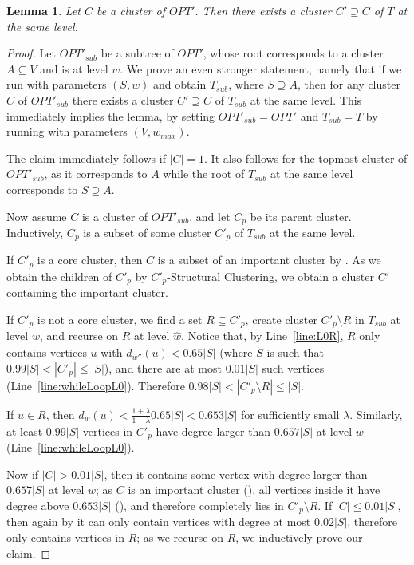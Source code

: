 \documentclass{article}
\newtheorem{lemma}[theorem]{Lemma}
\begin{document}
\begin{lemma} \label{lem:inclusion}
Let $C$ be a cluster of $OPT'$. Then there exists a cluster $C' \supseteq C$ of $T$ at the same level.
\end{lemma}
\begin{proof}
Let $OPT'_{sub}$ be a subtree of $OPT'$, whose root corresponds to a cluster $A\subseteq V$ and is at level $w$.
We prove an even stronger statement, namely that if we run  with parameters $(S,w)$ and obtain $T_{sub}$, where $S\supseteq A$, then for any cluster $C$ of $OPT'_{sub}$ there exists a cluster $C' \supseteq C$ of $T_{sub}$ at the same level.
This immediately implies the lemma, by setting $OPT'_{sub}=OPT'$ and $T_{sub}=T$ by running  with parameters $(V,w_{max})$.

The claim immediately follows if $|C|=1$.
It also follows for the topmost cluster of $OPT'_{sub}$, as it corresponds to $A$ while the root of $T_{sub}$ at the same level corresponds to $S\supseteq A$.

Now assume $C$ is a cluster of $OPT'_{sub}$, and let $C_p$ be its parent cluster. Inductively, $C_p$ is a subset of some cluster $C'_p$ of $T_{sub}$ at the same level.

If $C'_p$ is a core cluster, then $C$ is a subset of an important cluster by .
As we obtain the children of $C'_p$ by $C'_p$-Structural Clustering, we obtain a cluster $C'$ containing the important cluster.

If $C'_p$ is not a core cluster, we find a set $R\subseteq C'_p$, create cluster $C'_p\setminus R$ in $T_{sub}$ at level $w$, and recurse on $R$ at level $\widehat{w}$.
Notice that, by Line~\ref{line:L0R}, $R$ only contains vertices $u$ with $\widetilde{d_{w''}(u)} < 0.65 |S|$ (where $S$ is such that $0.99|S| < |C'_p| \le |S|$), and there are at most $0.01|S|$ such vertices (Line~\ref{line:whileLoopL0}).
Therefore $0.98|S| < |C'_p\setminus R| \le |S|$.

If $u\in R$, then $d_w(u) < \frac{1+\lambda}{1-\lambda} 0.65|S| < 0.653 |S|$ for sufficiently small $\lambda$.
Similarly, at least $0.99|S|$ vertices in $C'_p$ have degree larger than $0.657|S|$ at level $w$ (Line~\ref{line:whileLoopL0}).

Now if $|C| > 0.01|S|$, then it contains some vertex with degree larger than $0.657|S|$ at level $w$; as $C$ is an important cluster (), all vertices inside it have degree above $0.653 |S|$ (), and therefore completely lies in $C'_p\setminus R$.
If $|C| \le 0.01|S|$, then again by  it can only contain vertices with degree at most $0.02|S|$, therefore only contains vertices in $R$; as we recurse on $R$, we inductively prove our claim.
\end{proof}
\end{document}
